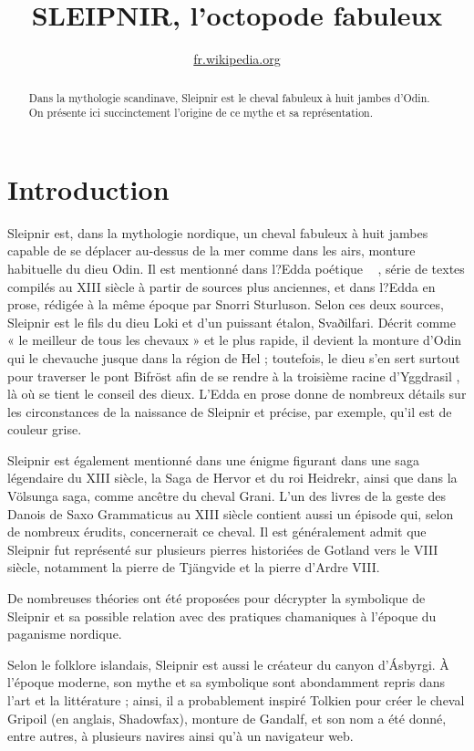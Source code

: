 \documentclass[a4paper, 12pt]{article}
\title{SLEIPNIR, l'octopode fabuleux}
\begin{document}
\date{\href{http://fr.wikipedia.org}{fr.wikipedia.org} }
\maketitle
\begin{abstract}

Dans la mythologie scandinave, Sleipnir est le cheval fabuleux à
  huit jambes d'Odin. On présente ici succinctement l'origine de ce
  mythe et sa représentation.
\end{abstract}
\section{Introduction}

Sleipnir est, dans la mythologie nordique, un cheval fabuleux à huit
jambes capable de se déplacer au-dessus de la mer comme dans les airs,
monture habituelle du dieu Odin.  Il est mentionné dans
l?Edda poétique ~\cite{Livre} , série de textes compilés au XIII
siècle à partir de sources plus anciennes, et dans l?Edda en prose,
rédigée à la même époque par Snorri Sturluson. Selon ces deux sources,
Sleipnir est le fils du dieu Loki et d'un puissant étalon,
Svaðilfari. Décrit comme « le meilleur de tous les chevaux » et le
plus rapide, il devient la monture d'Odin qui le chevauche jusque dans
la région de Hel ; toutefois, le dieu s'en sert surtout pour traverser
le pont Bifröst afin de se rendre à la troisième racine
d'Yggdrasil , là où se tient le conseil des
dieux. L'Edda en prose donne de nombreux détails sur les circonstances
de la naissance de Sleipnir et précise, par exemple, qu'il est de
couleur grise.

Sleipnir est également mentionné dans une énigme figurant dans une
saga légendaire du XIII siècle, la Saga de Hervor et du roi
Heidrekr, ainsi que dans la Völsunga saga, comme ancêtre du cheval
Grani. L'un des livres de la geste des Danois de Saxo Grammaticus au
XIII siècle contient aussi un épisode qui, selon de nombreux
érudits, concernerait ce cheval. Il est généralement admit que
Sleipnir fut représenté sur plusieurs pierres historiées de Gotland
vers le VIII siècle, notamment la pierre de Tjängvide et la
pierre d'Ardre VIII.

De nombreuses théories ont été proposées pour décrypter la symbolique
de Sleipnir et sa possible relation avec des pratiques chamaniques à
l'époque du paganisme nordique.

Selon le folklore islandais, Sleipnir est aussi le créateur du canyon
d'Ásbyrgi. À l'époque moderne, son mythe et sa symbolique sont
abondamment repris dans l'art et la littérature ; ainsi, il a
probablement inspiré Tolkien pour créer le cheval Gripoil (en anglais,
Shadowfax), monture de Gandalf, et son nom a été donné,
entre autres, à plusieurs navires ainsi qu'à un navigateur web.
\end{document}

